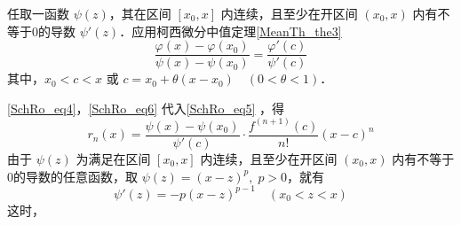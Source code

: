 任取一函数 $\psi(z)$，其在区间 $[x_0,x]$ 内连续，且至少在开区间 $(x_0,x)$ 内有不等于0的导数 $\psi'(z)$．应用柯西微分中值定理\autoref{MeanTh_the3}~
\begin{equation}\label{SchRo_eq5}
\frac{\varphi(x)-\varphi(x_0)}{\psi(x)-\psi(x_0)}=\frac{\varphi'(c)}{\psi'(c)}
\end{equation}
其中，$x_0<c<x$ 或 $c=x_0+\theta(x-x_0)\quad(0<\theta<1)$．

\autoref{SchRo_eq4}，\autoref{SchRo_eq6}  代入\autoref{SchRo_eq5} ，得
\begin{equation}\label{SchRo_eq7}
r_n(x)=\frac{\psi(x)-\psi(x_0)}{\psi'(c)}\cdot\frac{f^{(n+1)}(c)}{n!}(x-c)^n
\end{equation}
由于 $\psi(z)$ 为满足在区间 $[x_0,x]$ 内连续，且至少在开区间 $(x_0,x)$ 内有不等于0的导数的任意函数，取 $\psi(z)=(x-z)^p,\;p>0$，就有
\begin{equation}
\psi'(z)=-p(x-z)^{p-1}\quad (x_0<z<x)
\end{equation}
这时，